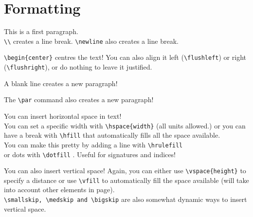 \documentclass[12pt, letterpaper]{article} %
\begin{document}
\clearpage %

\section{Formatting}

\begin{abstract}
	\verb+\begin{abstract}+ formats an abstract environment.
\end{abstract}

This is a first paragraph.\\
\verb+\\+ creates a line break.\newline
\verb+\newline+ also creates a line break. %

\begin{center}
	\verb+\begin{center}+ centres the text! You can also align it left (\verb+\flushleft+) or right (\verb+\flushright+), or do nothing 
	to leave it justified.
	
	A blank line creates a new paragraph!\par
	The \verb+\par+ command also creates a new paragraph!
\end{center}

You can insert horizontal space in text! \\
You can set a specific width with \verb+\hspace{width}+ \hspace{1cm} (all units 
allowed.)
or you can have a break with \verb+\hfill+ that automatically \hfill 
fills all the space available. \\ 
You can make this pretty by adding a line with \verb+\hrulefill+ \hrulefill \\
or dots with \verb+\dotfill+ \dotfill. Useful for signatures and indices!

You can also insert vertical space! 
Again, you can either use \verb+\vspace{height}+ to \vspace{5mm} \\
specify a distance or use \verb+\vfill+ to automatically \vfill fill the space 
available 
(will take into account other elements in page). \\  
\verb+\smallskip, \medskip and \bigskip+ are also 
somewhat dynamic ways to insert vertical space.
\end{document}
